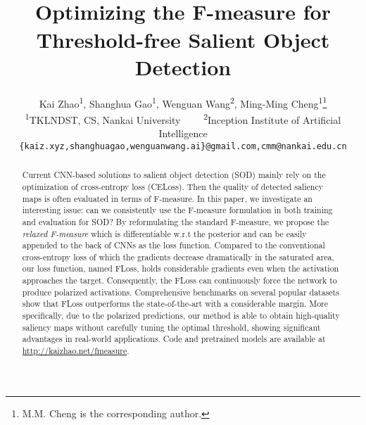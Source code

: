 \documentclass[10pt,twocolumn,letterpaper]{article}
\newcommand{\ConfInf}{\vspace{-.7in} {\normalsize \normalfont \color{blue}{
   IEEE International Conference on Computer Vision (ICCV) 2019}} \vspace{.45in} \\}
\begin{document}
\title{\ConfInf Optimizing the F-measure for Threshold-free Salient Object Detection}

\author{
  Kai Zhao\textsuperscript{1}, Shanghua Gao\textsuperscript{1},
  Wenguan Wang\textsuperscript{2},
  Ming-Ming Cheng\textsuperscript{1}\thanks{M.M. Cheng is the corresponding author.}\\
  \textsuperscript{1}TKLNDST, CS, Nankai University~~~~ 
  \textsuperscript{2}Inception Institute of Artificial Intelligence\\
  {\tt\small \{kaiz.xyz,shanghuagao,wenguanwang.ai\}@gmail.com,cmm@nankai.edu.cn}
}

\maketitle
\thispagestyle{empty}


\begin{abstract}
  Current CNN-based solutions to salient object detection (SOD)
  mainly rely on the optimization of cross-entropy loss (CELoss).
  Then the quality of detected saliency maps is often evaluated in
  terms of F-measure.
  In this paper, we investigate an interesting issue:
  can we consistently use the F-measure formulation in both training and evaluation
  for SOD?
  By reformulating the standard F-measure, 
  we propose the \emph{relaxed F-measure} which is differentiable w.r.t 
  the posterior and can be easily appended to the back of CNNs as the loss function.
  Compared to the conventional cross-entropy loss of which the gradients decrease
  dramatically in the saturated area,
  our loss function, named FLoss, holds considerable gradients even when the activation
  approaches the target.
  Consequently, the FLoss can continuously force the network
  to produce polarized activations.
  Comprehensive benchmarks on several popular datasets show that FLoss
  outperforms the state-of-the-art with a considerable margin.
  More specifically, due to the polarized predictions,
  our method is able to obtain high-quality saliency maps without carefully tuning
  the optimal threshold, showing significant advantages in real-world applications.
  Code and pretrained models are available at \url{http://kaizhao.net/fmeasure}.
\end{abstract}

\end{document}
